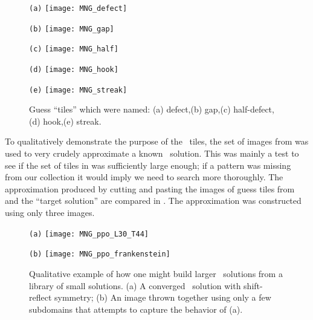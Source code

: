 \begin{figure} %
\centering
\begin{minipage}[height=.15\textheight]{.15\textwidth}
\centering \small{\texttt{(a)}}
\texttt{[image: MNG\_defect]}
\end{minipage}
\begin{minipage}[height=.15\textheight]{.15\textwidth}
\centering \small{\texttt{(b)}}
\texttt{[image: MNG\_gap]}
\end{minipage}
\begin{minipage}[height=.15\textheight]{.15\textwidth}
\centering \small{\texttt{(c)}}
\texttt{[image: MNG\_half]}
\end{minipage}
\begin{minipage}[height=.15\textheight]{.15\textwidth}
\centering \small{\texttt{(d)}}
\texttt{[image: MNG\_hook]}
\end{minipage}
\begin{minipage}[height=.15\textheight]{.15\textwidth}
\centering \small{\texttt{(e)}}
\texttt{[image: MNG\_streak]}
\end{minipage}
\caption{ \label{fig:MNGtilescrude}
Guess ``tiles'' which were named:
(a) defect,(b) gap,(c) half-defect,(d) hook,(e) streak.
}
\end{figure}

To qualitatively demonstrate the purpose of the \spt\ tiles, the set of images from 
was used to very crudely approximate a known \spt\ solution. This was mainly a test to see if
the set of tiles in  was sufficiently large enough; if a pattern was
missing from our collection it would imply we need to search more thoroughly.
The approximation produced by cutting and pasting the images of guess tiles from 
and the ``target solution'' are compared in . The approximation was constructed
using only three images.

\begin{figure} %
\centering
\begin{minipage}[height=.3\textheight]{.3\textwidth}
\centering \small{\texttt{(a)}}
\texttt{[image: MNG\_ppo\_L30\_T44]}
\end{minipage}
\begin{minipage}[height=.2\textheight]{.2\textwidth}
\centering \small{\texttt{(b)}}
\texttt{[image: MNG\_ppo\_frankenstein]}
\end{minipage}
\caption{ \label{fig:MNGfrankensteinconcept}
Qualitative example of how one might build larger \spt\ solutions from a
library of small solutions. (a) A converged \twot\ solution with
shift-reflect symmetry; (b) An image thrown together using only a few
subdomains that attempts to capture the behavior of (a).
}
\end{figure}

